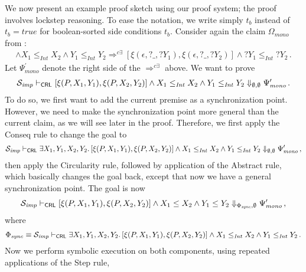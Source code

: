 We now present an example proof sketch using our proof system; the proof involves lockstep reasoning.
To ease the notation, we write simply $t_b$ instead of $t_b = \mathit{true}$ for
boolean-sorted side conditions $t_b$.
Consider again the claim $\Omega_{\mathit{mono}}$ from :
\begin{align*}
  [\xi(P, X_1, Y_1),\xi(P, X_2, Y_2)] \land X_1 \leq_{\mathit{Int}} X_2 \land Y_1 \leq_{\mathit{Int}} Y_2
   \Rightarrow^{c\exists} [\xi(\epsilon, ?\_, ?Y_1), \xi(\epsilon, ?\_, ?Y_2)] \land ?Y_1 \leq_{\mathit{Int}} ?Y_2 \, .
\end{align*}
Let $\Psi^\prime_{\mathit{mono}}$ denote the right side of the $\Rightarrow^{c\exists}$ above.
We want to prove
\begin{align*}
  \mathcal{S}_{\mathit{imp}} \vdash_{\mathsf{CRL}} [\xi(P, X_1, Y_1),\xi(P, X_2, Y_2)] \land X_1 \leq_{\mathit{Int}} X_2 \land Y_1 \leq_{\mathit{Int}} Y_2
  \Downarrow_{\emptyset, \emptyset} \Psi^\prime_{\mathit{mono}} \, .
\end{align*}
To do so, we first want to add the current premise as a synchronization point.
However, we need to make the synchronization point more general than the current claim, as we will see later in the proof.
Therefore, we first apply the Conseq rule to change the goal to
\begin{align*}
  \mathcal{S}_{\mathit{imp}} \vdash_{\mathsf{CRL}} \exists X_1,Y_1,X_2,Y_2.\, [\xi(P, X_1, Y_1),\xi(P, X_2, Y_2)] \land X_1 \leq_{\mathit{Int}} X_2 \land Y_1 \leq_{\mathit{Int}} Y_2
  \Downarrow_{\emptyset, \emptyset} \Psi^\prime_{\mathit{mono}} \, ,
\end{align*}
then apply the Circularity rule, followed by application of the Abstract rule, which basically changes the goal
back, except that now we have a general synchronization point. The goal is now
\begin{align*}
  \mathcal{S}_{\mathit{imp}} \vdash_{\mathsf{CRL}} [\xi(P, X_1, Y_1),\xi(P, X_2, Y_2)] \land X_1 \leq X_2 \land Y_1 \leq Y_2
  \Downarrow_{\Phi_{\mathit{sync}}, \emptyset} \Psi^\prime_{\mathit{mono}} \, ,
\end{align*}
where
\begin{align*}
  \Phi_{\mathit{sync}} \equiv \mathcal{S}_{\mathit{imp}} \vdash_{\mathsf{CRL}} \exists X_1,Y_1,X_2,Y_2.\, [\xi(P, X_1, Y_1),\xi(P, X_2, Y_2)] \land X_1 \leq_{\mathit{Int}} X_2 \land Y_1 \leq_{\mathit{Int}} Y_2 \, .
\end{align*}
Now we perform symbolic execution on both components, using repeated applications of the Step rule,
